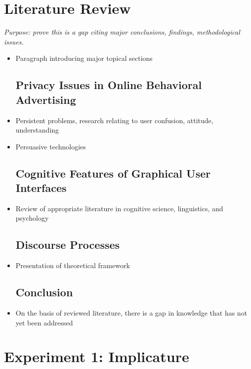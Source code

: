 \section{Literature Review}
\label{literaturereview}

\emph{Purpose: prove this is a gap citing major conclusions, findings, methodological issues.}

\begin{itemize}
\item Paragraph introducing major topical sections

\subsection{Privacy Issues in Online Behavioral Advertising}
\label{privacyissuesinonlinebehavioraladvertising}

\item Persistent problems, research relating to user confusion, attitude, understanding

\item Persuasive technologies

\subsection{Cognitive Features of Graphical User Interfaces}
\label{cognitivefeaturesofgraphicaluserinterfaces}

\item Review of appropriate literature in cognitive science, linguistics, and psychology

\subsection{Discourse Processes}
\label{discourseprocesses}

\item Presentation of theoretical framework

\subsection{Conclusion}
\label{conclusion}

\item On the basis of reviewed literature, there is a gap in knowledge that has not yet been addressed

\end{itemize}

\section{Experiment 1: Implicature}
\label{experiment1:implicature}

